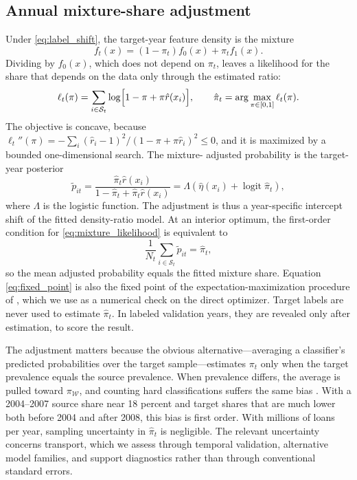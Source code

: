\documentclass[letterpaper,12pt,usenames,dvipsnames]{article}
\newcommand{\pbrac}[1]{\left( #1 \right)}
\newcommand{\Bigsbrac}[1]{\Bigl[ #1 \Bigr]}
\theoremstyle{definition}
\begin{document}
\subsection{Annual mixture-share adjustment}\label{sec:est_mixture}

Under \eqref{eq:label_shift}, the target-year feature density is the mixture
\begin{equation}
	f_t(x) = (1 - \pi_t) f_0(x) + \pi_t f_1(x) .
	\label{eq:mixture}
\end{equation}
Dividing by $f_0(x)$, which does not depend on $\pi_t$, leaves a likelihood for the share that
depends on the data only through the estimated ratio:
\begin{equation}
	\ell_t(\pi) = \sum_{i \in \mathcal{S}_t} \log\Bigsbrac{1 - \pi + \pi \hat{r}(x_i)},
	\qquad
	\hat{\pi}_t = \arg\max_{\pi \in [0, 1]} \ell_t(\pi) .
	\label{eq:mixture_likelihood}
\end{equation}
The objective is concave, because $\ell_t''(\pi) = -\sum_i (\hat{r}_i - 1)^2 / (1 - \pi + \pi
\hat{r}_i)^2 \leq 0$, and it is maximized by a bounded one-dimensional search. The mixture-
adjusted probability is the target-year posterior
\begin{equation}
	\tilde{p}_{it} = \frac{\hat{\pi}_t \hat{r}(x_i)}{1 - \hat{\pi}_t + \hat{\pi}_t
		\hat{r}(x_i)}
	= \Lambda\pbrac{\hat{\eta}(x_i) + \operatorname{logit} \hat{\pi}_t} ,
	\label{eq:adjusted_probability}
\end{equation}
where $\Lambda$ is the logistic function. The adjustment is thus a year-specific intercept
shift of the fitted density-ratio model. At an interior optimum, the first-order condition for
\eqref{eq:mixture_likelihood} is equivalent to
\begin{equation}
	\frac{1}{N_t} \sum_{i \in \mathcal{S}_t} \tilde{p}_{it} = \hat{\pi}_t ,
	\label{eq:fixed_point}
\end{equation}
so the mean adjusted probability equals the fitted mixture share. Equation
\eqref{eq:fixed_point} is also the fixed point of the expectation-maximization procedure of
\citet{saerens2002adjusting}, which we use as a numerical check on the direct optimizer. Target
labels are never used to estimate $\hat{\pi}_t$. In labeled validation years, they are revealed
only after estimation, to score the result.

The adjustment matters because the obvious alternative---averaging a classifier's predicted
probabilities over the target sample---estimates $\pi_t$ only when the target prevalence equals
the source prevalence. When prevalence differs, the average is pulled toward
$\pi_{\mathcal{W}}$, and counting hard classifications suffers the same bias
\citep{gonzalez2017review}. With a 2004--2007 source share near 18 percent and target shares
that are much lower both before 2004 and after 2008, this bias is first order. With millions of
loans per year, sampling uncertainty in $\hat{\pi}_t$ is negligible. The relevant uncertainty
concerns transport, which we assess through temporal validation, alternative model families,
and support diagnostics rather than through conventional standard errors.
\end{document}
